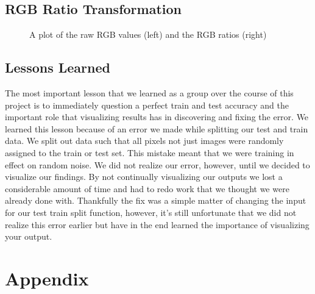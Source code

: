 \documentclass[paper=letter, fontsize=12pt]{article}
\newcommand\includeappendices{%
  \appendix
  \renewcommand{\thesection}{\Alph{section}}
  \section{Appendix}
  \the\mainnotetoks}
\numberwithin{equation}{section} %
\numberwithin{figure}{section} %
\numberwithin{table}{section} %
\begin{document}
\begin{appendixatend}
    \subsection{RGB Ratio Transformation}
    \begin{figure}
      \caption{A plot of the raw RGB values (left) and the RGB ratios (right)}
    \end{figure}
    \label{fig:color_plots}
\end{appendixatend}

\subsection{ Lessons Learned }

The most important lesson that we learned as a group over the course of this project
is to immediately question a perfect train and test accuracy and the important
 role that visualizing results has in discovering and fixing the error. We
 learned this lesson because of an error we made while splitting our test and
 train data. We split out data such that all pixels not just images were randomly
 assigned to the train or test set. This mistake meant that we were training in
 effect on random noise. We did not realize our error, however, until we decided to
 visualize our findings. By not continually visualizing our outputs we lost a
 considerable amount of time and had to redo work that we thought we were already
 done with. Thankfully the fix was a simple matter of changing the input for our
 test train split function, however, it's still unfortunate that we did not
 realize this error earlier but have in the end learned the importance of
 visualizing your output.


\newpage

\printbibliography

\newpage

\includeappendices
\end{document}
